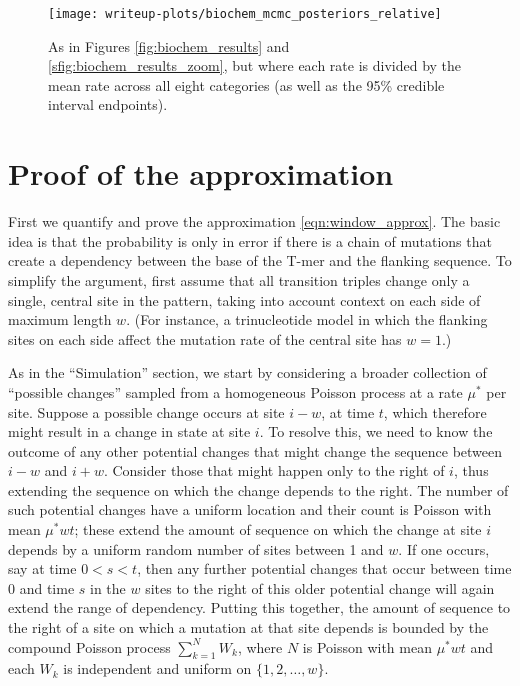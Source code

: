 \documentclass{article}
\theoremstyle{plain}
\theoremstyle{definition}
\begin{document}
\begin{figure}
    \begin{center}
        \texttt{[image: writeup-plots/biochem\_mcmc\_posteriors\_relative]}
    \end{center}
    \caption{
        As in Figures \ref{fig:biochem_results} and \ref{sfig:biochem_results_zoom},
        but where each rate is divided by the mean rate across all eight categories
        (as well as the 95\% credible interval endpoints).
        \label{sfig:biochem_results_relative}}
\end{figure}


\section{Proof of the approximation}
\label{ss:approx_pf}

First we quantify and prove the approximation \eqref{eqn:window_approx}.
The basic idea is that the probability is only in error if there is a chain of mutations
that create a dependency between the base of the T-mer and the flanking sequence.
To simplify the argument, first assume that all transition triples
change only a single, central site in the pattern,
taking into account context on each side of maximum length $w$.
(For instance, a trinucleotide model in which the flanking sites on each side
affect the mutation rate of the central site has $w=1$.)

As in the ``Simulation'' section, we start by considering a broader collection
of ``possible changes'' sampled from a homogeneous
Poisson process at a rate $\mu^*$ per site.
Suppose a possible change occurs at site $i-w$, at time $t$,
which therefore might result in a change in state at site $i$.
To resolve this, we need to know the outcome of any other potential changes
that might change the sequence between $i-w$ and $i + w$.
Consider those that might happen only to the right of $i$,
thus extending the sequence on which the change depends to the right.
The number of such potential changes have a uniform location
and their count is Poisson with mean $\mu^* w t$;
these extend the amount of sequence on which the change at site $i$ depends
by a uniform random number of sites between 1 and $w$.
If one occurs, say at time $0 < s < t$,
then any further potential changes that occur between time 0 and time $s$
in the $w$ sites to the right of this older potential change
will again extend the range of dependency.
Putting this together, the amount of sequence to the right of a site
on which a mutation at that site depends
is bounded by the compound Poisson process $\sum_{k=1}^N W_k$,
where $N$ is Poisson with mean $\mu^* w t$
and each $W_k$ is independent and uniform on $\{1, 2, \ldots, w\}$.
\end{document}

